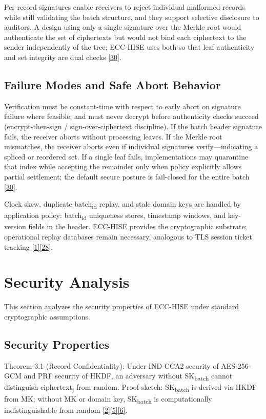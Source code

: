 \indent Per-record signatures enable receivers to reject individual malformed records while still validating the batch structure, and they support selective disclosure to auditors. A design using only a single signature over the Merkle root would authenticate the set of ciphertexts but would not bind each ciphertext to the sender independently of the tree; ECC-HISE uses both so that leaf authenticity and set integrity are dual checks \hyperref[ref:30]{[30]}.

\subsection{Failure Modes and Safe Abort Behavior}

\indent Verification must be constant-time with respect to early abort on signature failure where feasible, and must never decrypt before authenticity checks succeed (encrypt-then-sign / sign-over-ciphertext discipline). If the batch header signature fails, the receiver aborts without processing leaves. If the Merkle root mismatches, the receiver aborts even if individual signatures verify---indicating a spliced or reordered set. If a single leaf fails, implementations may quarantine that index while accepting the remainder only when policy explicitly allows partial settlement; the default secure posture is fail-closed for the entire batch \hyperref[ref:30]{[30]}.

\indent Clock skew, duplicate batch\textsubscript{id} replay, and stale domain keys are handled by application policy: batch\textsubscript{id} uniqueness stores, timestamp windows, and key-version fields in the header. ECC-HISE provides the cryptographic substrate; operational replay databases remain necessary, analogous to TLS session ticket tracking \hyperref[ref:1]{[1]}\hyperref[ref:28]{[28]}.

\section{Security Analysis}

\indent This section analyzes the security properties of ECC-HISE under standard cryptographic assumptions.

\subsection{Security Properties}

\indent Theorem 3.1 (Record Confidentiality): Under IND-CCA2 security of AES-256-GCM and PRF security of HKDF, an adversary without SK\textsubscript{batch} cannot distinguish ciphertext\textsubscript{j} from random. Proof sketch: SK\textsubscript{batch} is derived via HKDF from MK; without MK or domain key, SK\textsubscript{batch} is computationally indistinguishable from random \hyperref[ref:2]{[2]}\hyperref[ref:5]{[5]}\hyperref[ref:6]{[6]}.

